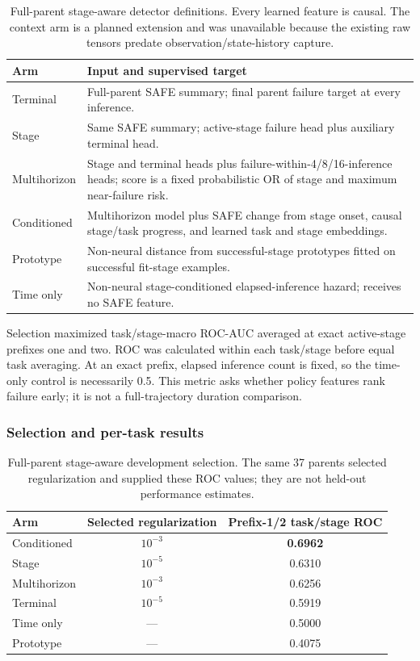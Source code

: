 \documentclass[11pt,a4paper]{article}
\begin{document}
\begin{table}[H]
\centering
\caption{Full-parent stage-aware detector definitions. Every learned feature
is causal. The context arm is a planned extension and was unavailable because
the existing raw tensors predate observation/state-history capture.}
\label{tab:xr1-stage-aware-models}
\small
\begin{tabularx}{\textwidth}{p{}X}
\toprule
Arm & Input and supervised target\\
\midrule
Terminal & Full-parent SAFE summary; final parent failure target at every inference.\\
Stage & Same SAFE summary; active-stage failure head plus auxiliary terminal head.\\
Multihorizon & Stage and terminal heads plus failure-within-4/8/16-inference heads; score is a fixed probabilistic OR of stage and maximum near-failure risk.\\
Conditioned & Multihorizon model plus SAFE change from stage onset, causal stage/task progress, and learned task and stage embeddings.\\
Prototype & Non-neural distance from successful-stage prototypes fitted on successful fit-stage examples.\\
Time only & Non-neural stage-conditioned elapsed-inference hazard; receives no SAFE feature.\\
\bottomrule
\end{tabularx}
\end{table}

Selection maximized task/stage-macro ROC-AUC averaged at exact active-stage
prefixes one and two. ROC was calculated within each task/stage before equal
task averaging. At an exact prefix, elapsed inference count is fixed, so the
time-only control is necessarily 0.5. This metric asks whether policy features
rank failure early; it is not a full-trajectory duration comparison.

\subsubsection{Selection and per-task results}
\begin{table}[H]
\centering
\caption{Full-parent stage-aware development selection. The same 37 parents
selected regularization and supplied these ROC values; they are not held-out
performance estimates.}
\label{tab:xr1-stage-aware-selection}
\begin{tabular}{lcc}
\toprule
Arm & Selected regularization & Prefix-1/2 task/stage ROC\\
\midrule
Conditioned & $10^{-3}$ & \textbf{0.6962}\\
Stage & $10^{-5}$ & 0.6310\\
Multihorizon & $10^{-3}$ & 0.6256\\
Terminal & $10^{-5}$ & 0.5919\\
Time only & --- & 0.5000\\
Prototype & --- & 0.4075\\
\bottomrule
\end{tabular}
\end{table}
\end{document}
